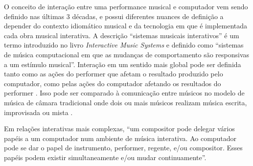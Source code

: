 \documentclass{ppgmus}
\begin{document}

O conceito de interação entre uma performance musical e computador vem
sendo definido nas últimas 3 décadas, e possui diferentes nuances de definição
a depender do contexto idiomático musical e da tecnologia
em que é implementada cada obra musical interativa. A descrição ``sistemas musicais interativos'' é um
termo introduzido no livro \textit{Interactive Music Systems} 
\cite{rowe93:interactive} e definido como ``sistemas de música 
computacional em que as mudanças de comportamento são responsivas a um
estímulo musical''. Interação em um sentido mais global pode ser definida
tanto como as ações do performer que afetam o resultado produzido pelo computador, como pelas ações do computador
afetando os resultados do performer \cite{garnett:2001}.
Isso pode ser comparado à comunicação entre músicos no modelo de  música de 
câmara tradicional onde dois ou mais músicos realizam música escrita, improvisada 
ou mista \cite{winkler93:interactive}.

Em relações interativas mais complexas, ``um compositor pode
delegar vários papéis a um computador num ambiente de música interativa. Ao
computador pode se dar o papel de instrumento, performer, regente, e/ou compositor.
Esses papéis podem existir  simultaneamente e/ou mudar continuamente''\cite{lippe:2002}.
\end{document}
